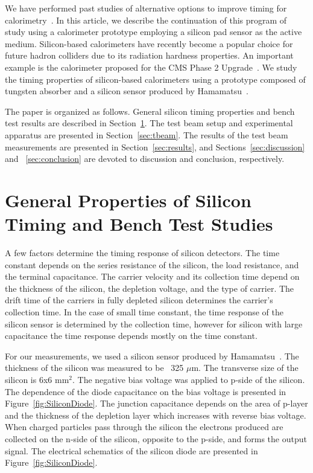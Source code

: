 \documentclass[12pt]{article}
\begin{document}
{We have performed past studies of alternative options to improve 
timing for calorimetry~\cite{Anderson:2015gha, MCPFastCaloNIMA, Ronzhin2015288,Ronzhin201552}.
In this article, we describe the continuation of this program of study using a calorimeter
prototype employing a silicon pad sensor as the active medium. Silicon-based
calorimeters have recently become a popular choice for future hadron colliders due to its radiation 
hardness properties. An important example is the calorimeter proposed for the CMS Phase 2
Upgrade~\cite{Butler:2020886}. We study the timing properties of silicon-based calorimeters
using a prototype composed of tungsten absorber and a silicon sensor produced by 
Hamamatsu~\cite{hamamatsu}. 

The paper is organized as follows. General silicon timing properties 
and bench test results are described in Section~\ref{sec:siliconpad}. 
The test beam setup and experimental apparatus are presented in Section~\ref{sec:tbeam}. 
The results of the test beam measurements are presented in Section~\ref{sec:results},
and Sections~\ref{sec:discussion} and ~\ref{sec:conclusion} are devoted to discussion and 
conclusion, respectively.


\section{General Properties of Silicon Timing and Bench Test Studies}
\label{sec:siliconpad}




A few factors determine the timing response of silicon detectors. The
time constant depends on the series resistance of the silicon, the load
resistance, and the terminal capacitance. The carrier velocity and its collection
time depend on the thickness of the silicon, the depletion voltage, and the type of
carrier. The drift time of the carriers in fully depleted silicon determines the 
carrier’s collection time. In the case of small time constant, the time
response of the silicon sensor is determined by the collection time, however
for silicon with large capacitance the time response depends mostly on the
time constant.

For our measurements, we used a silicon sensor produced by Hamamatsu~\cite{hamamatsu}. The
thickness of the silicon was measured to be ~325 $\mu$m. The transverse size of the silicon is
6x6 mm$^2$. The negative bias voltage was applied to p-side of the silicon. The
dependence of the diode capacitance on the bias voltage is presented in
Figure~\ref{fig:SiliconDiode}. The junction capacitance depends on the area of
p-layer and the thickness of the depletion layer which increases with reverse
bias voltage. When charged particles pass through the silicon the electrons produced
are collected on the n-side of the silicon, opposite to the p-side, and forms
the output signal. The electrical schematics of the silicon diode are 
presented in Figure~\ref{fig:SiliconDiode}.


}
\end{document}
